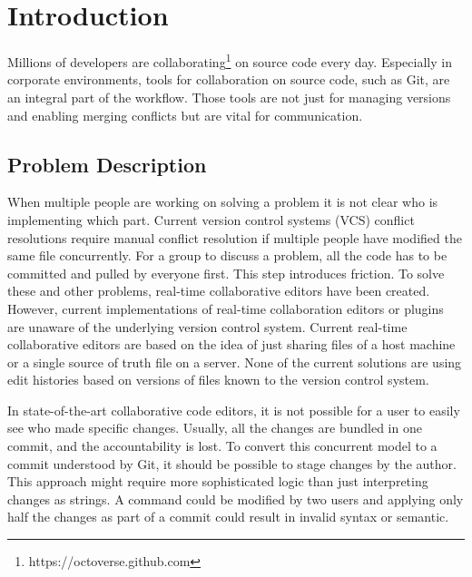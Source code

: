\chapter{Introduction}
\label{sec:introduction}

Millions of developers are collaborating\footnote{https://octoverse.github.com} on source code every day.
Especially in corporate environments, tools for collaboration on source code, such as Git, are an integral part of the workflow.
Those tools are not just for managing versions and enabling merging conflicts but are vital for communication.

\section{Problem Description}

When multiple people are working on solving a problem it is not clear who is implementing which part. Current version control systems (VCS) conflict resolutions require manual conflict resolution if multiple people have modified the same file concurrently.
For a group to discuss a problem, all the code has to be committed and pulled by everyone first. This step introduces friction. To solve these and other problems, real-time collaborative editors have been created.
However, current implementations of real-time collaboration editors or plugins are unaware of the underlying version control system. Current real-time collaborative editors are based on the idea of just sharing files of a host machine or a single source of truth file on a server. None of the current solutions are using edit histories based on versions of files known to the version control system.

In state-of-the-art collaborative code editors, it is not possible for a user to easily see who made specific changes. Usually, all the changes are bundled in one commit, and the accountability is lost. To convert this concurrent model to a commit understood by Git, it should be possible to stage changes by the author. This approach might require more sophisticated logic than just interpreting changes as strings. A command could be modified by two users and applying only half the changes as part of a commit could result in invalid syntax or semantic.

